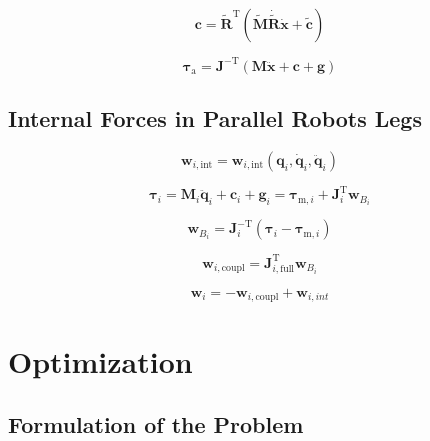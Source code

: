 \documentclass[fleqn,a4paper,10pt]{article}
\newcommand{\bm}[1]{\mathbf{#1}}
\newcommand{\transp}[0]{{\mathrm{T}}}
\begin{document}
\begin{multicols}{2}
\begin{equation}
\bm{c}=\tilde{\bm{R}}^\transp (\tilde{\bm{M}}\dot{\tilde{\bm{R}}}\dot{\bm{x}}+\tilde{\bm{c}})
\end{equation}

\begin{equation}
\bm{\tau}_\mathrm{a}=\bm{J}^{-\transp} (\bm{M}\ddot{\bm{x}}+\bm{c}+\bm{g})
\end{equation}



\subsection{Internal Forces in Parallel Robots Legs}

\cite{KhalilGue2004}

\begin{equation}
\bm{w}_{i,\mathrm{int}}=\bm{w}_{i,\mathrm{int}}(\bm{q}_i,\dot{\bm{q}}_i,\ddot{\bm{q}}_i)
\end{equation} %

\begin{equation}
\bm{\tau}_i
=\bm{M}_i \ddot{\bm{q}}_i + \bm{c}_i + \bm{g}_i
=\bm{\tau}_{\mathrm{m},i} + \bm{J}_{i}^{\transp} \bm{w}_{B_i}
\end{equation}

\begin{equation}
\bm{w}_{B_i}=\bm{J}_{i}^{-\transp} (\bm{\tau}_i - \bm{\tau}_{\mathrm{m},i})
\end{equation}

\begin{equation}
\bm{w}_{i,\mathrm{coupl}}=\bm{J}_{i,\mathrm{full}}^{\transp} \bm{w}_{B_i}
\end{equation}


\begin{equation}
\bm{w}_{i} = -\bm{w}_{i,\mathrm{coupl}} + \bm{w}_{i,int}
\end{equation}


\section{Optimization}
\label{sec:opti}

\subsection{Formulation of the Problem}


\end{multicols}
\end{document}
